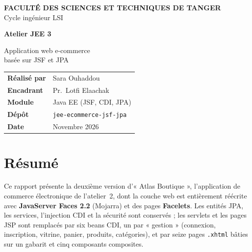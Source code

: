 \documentclass[11pt,a4paper]{report}
\newcommand{\auteur}{Sara Ouhaddou}
\newcommand{\encadrant}{Pr.~Lotfi Elaachak}
\newcommand{\dateRapport}{Novembre 2026}
\begin{document}
\begin{titlepage}
\thispagestyle{empty}
\vspace*{1.2cm}
{\color{white}
{\small\textcolor{atlassaffron}{\bfseries FACULT\'E DES SCIENCES ET TECHNIQUES DE TANGER}}\\[2pt]
{\small Cycle ing\'enieur LSI}\\[1.4cm]
{\fontsize{30}{34}\selectfont\bfseries Atelier JEE 3\par}
\vspace{6pt}
{\Large Application web e-commerce\\ bas\'ee sur JSF et JPA\par}
}
\vfill
\begin{tabular}{@{}ll}
\textbf{R\'ealis\'e par} & \auteur\\[4pt]
\textbf{Encadrant} & \encadrant\\[4pt]
\textbf{Module} & Java EE (JSF, CDI, JPA)\\[4pt]
\textbf{D\'ep\^ot} & \texttt{jee-ecommerce-jsf-jpa}\\[4pt]
\textbf{Date} & \dateRapport
\end{tabular}
\vspace{1.5cm}
\end{titlepage}

\chapter*{Résumé}
Ce rapport présente la deuxième version d'« Atlas Boutique », l'application de commerce électronique de
l'atelier~2, dont la couche web est entièrement réécrite avec \textbf{JavaServer Faces 2.2} (Mojarra) et des
pages \textbf{Facelets}. Les entités JPA, les services, l'injection CDI et la sécurité sont conservés ; les
servlets et les pages JSP sont remplacés par six beans CDI, un par « gestion » (connexion, inscription,
vitrine, panier, produits, catégories), et par seize pages \texttt{.xhtml} bâties sur un gabarit et cinq
composants composites.
\end{document}

